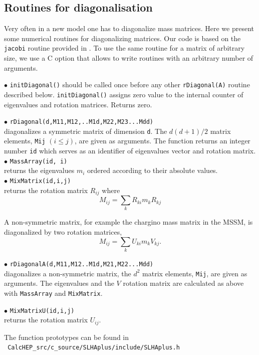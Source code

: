 \documentclass[12pt,a4paper]{article}
\begin{document}
\subsection{Routines for diagonalisation}

Very often in a new model  one has to diagonalize 
mass matrices. Here we present some numerical routines for 
diagonalizing matrices. Our code is based on the \verb|jacobi| routine provided in 
 \cite{Numerical}. To use the same routine for a matrix of arbitrary size, we 
use a C option that allows to write routines with an arbitrary number of arguments. 

\noindent 
$\bullet$ \verb|initDiagonal()| should be called once  before any other 
\verb|rDiagonal(A)| routine described below. \verb|initDiagonal()| assigns zero value 
to the internal counter of  eigenvalues and rotation matrices. Returns zero.

\noindent
$\bullet$ \verb|rDiagonal(d,M11,M12,..M1d,M22,M23...Mdd)|\\
diagonalizes a symmetric matrix of dimension \verb|d|. The  
$d(d+1)/2$  matrix elements, \verb|Mij| $(i\le j)$, are given as arguments.
The function returns an integer number \verb|id| which serves as an  identifier 
of eigenvalues vector and rotation matrix.\\
\noindent
$\bullet$ \verb|MassArray(id, i)|\\ returns the eigenvalues  $m_i$ ordered according to 
their absolute values. \\
\noindent
$\bullet$ \verb|MixMatrix(id,i,j)|\\ returns the rotation matrix  $R_{ij}$ where
$$  M_{ij} = \sum\limits_k  R_{ki} m_k R_{kj}$$

A non-symmetric matrix, for example the 
chargino mass matrix in the  MSSM, is diagonalized by  two rotation matrices,
$$  M_{ij} = \sum\limits_k  U_{ki} m_k V_{kj}.$$ 

\noindent
$\bullet$ \verb|rDiagonalA(d,M11,M12..M1d,M21,M22...Mdd)|\\ 
diagonalizes a non-symmetric matrix, the $d^2$  matrix elements, \verb|Mij|, are given as arguments.
The eigenvalues and the $V$ rotation matrix are calculated as above with 
\verb|MassArray| and \verb|MixMatrix|. 

\noindent
$\bullet$ \verb|MixMatrixU(id,i,j)|\\
returns the rotation matrix $U_{ij}$.

The function prototypes can be found in \\
\noindent
\verb| CalcHEP_src/c_source/SLHAplus/include/SLHAplus.h|
\end{document}
